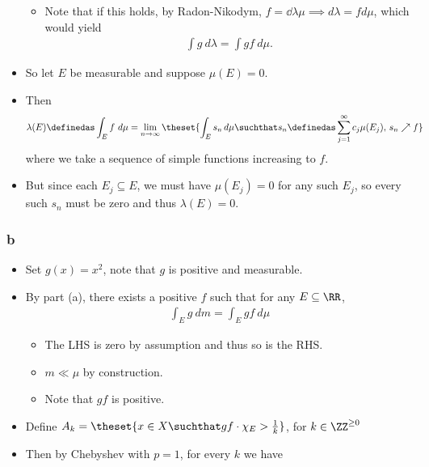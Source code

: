 \begin{solution}
\begin{itemize}
  \begin{itemize}
  \tightlist
  \item
    Note that if this holds, by Radon-Nikodym,
    \(f = \dd{\lambda}{\mu} \implies d\lambda = f d\mu\), which would
    yield
    \begin{align*}  
    \int g ~d\lambda = \int g f ~d\mu
    .\end{align*}
  \end{itemize}
\item
  So let \(E\) be measurable and suppose \(\mu(E) = 0\).
\item
  Then
  \begin{align*}
  \lambda(E) \definedas \int_E f ~d\mu 
  &= \lim_{n\to\infty} \theset{\int_E s_n \,d\mu \suchthat s_n \definedas \sum_{j=1}^\infty c_j \mu(E_j),\, s_n \nearrow f}
  \end{align*} where we take a sequence of simple functions increasing
  to \(f\).
\item
  But since each \(E_j \subseteq E\), we must have \(\mu(E_j) = 0\) for
  any such \(E_j\), so every such \(s_n\) must be zero and thus
  \(\lambda(E) = 0\).
\end{itemize}


\hypertarget{b-10}{%
\subsubsection{b}\label{b-10}}

\begin{itemize}
\item
  Set \(g(x) = x^2\), note that \(g\) is positive and measurable.
\item
  By part (a), there exists a positive \(f\) such that for any
  \(E\subseteq \RR\),
  \begin{align*}
  \int_E g ~dm = \int_E gf ~d\mu 
  \end{align*}

  \begin{itemize}
  \item
    The LHS is zero by assumption and thus so is the RHS.
  \item
    \(m \ll \mu\) by construction.
  \item
    Note that \(gf\) is positive.
  \end{itemize}
\item
  Define
  \(A_k = \theset{x\in X \suchthat gf \cdot \chi_E > {1 \over k} }\),
  for \(k\in \ZZ^{\geq 0}\)
\item
  Then by Chebyshev with \(p=1\), for every \(k\) we have
\end{itemize}


\end{solution}
